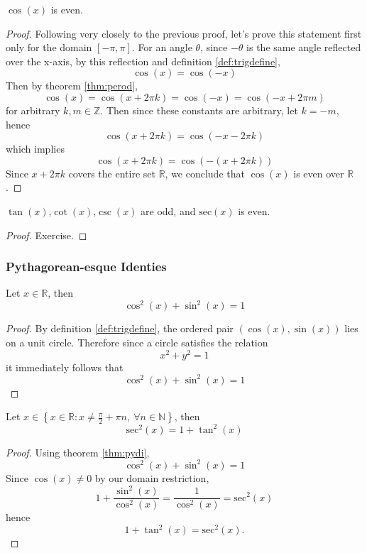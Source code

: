 \documentclass[11pt]{article}
\numberwithin{lemma}{section}
\numberwithin{equation}{section}
\numberwithin{define}{section}
\numberwithin{prop}{section}
\numberwithin{figure}{section}
\numberwithin{theorem}{section}
\numberwithin{cor}{section}
\newcounter{ex}[section]
\numberwithin{ex}{section}
\def\real{\mathbb{R}}
\def\nat{\mathbb{N}}
\def\integ{\mathbb{Z}}
\def\cbrak#1{\left\{#1\right\}}
\begin{document}
\begin{theorem}
	$\cos(x)$ is even.
	\label{thm:coseven}
\end{theorem}
\begin{proof}
	Following very closely to the previous proof, let's prove this statement first only for the domain $[-\pi,\pi]$.
	For an angle $\theta$, since $-\theta$ is the same angle reflected over the x-axis, by this reflection and definition \eqref{def:trigdefine},
	$$\cos(x)=\cos(-x)$$
	Then by theorem \eqref{thm:perod},
	$$\cos(x)=\cos(x+2\pi k)=\cos(-x)=\cos(-x+2\pi m)$$
	for arbitrary $k,m\in\integ$. Then since these constants are arbitrary, let $k=-m$, hence
	$$\cos(x+2\pi k)=\cos(-x-2\pi k)$$
	which implies
	$$\cos(x+2\pi k)=\cos(-(x+2\pi k))$$
	Since $x+2\pi k$ covers the entire set $\real$, we conclude that $\cos(x)$ is even over $\real$.
\end{proof}

\begin{cor}
	$\tan(x)$,$\cot(x)$,$\csc(x)$ are odd, and $\text{sec}(x)$ is even.
\end{cor}
\begin{proof}
	Exercise.
\end{proof}



\subsubsection{Pythagorean-esque Identies}
\begin{theorem}
\label{thm:pydi}
Let $x\in\real$, then
$$\cos^2(x)+\sin^2(x)=1$$
\end{theorem}
\begin{proof}
	By definition \eqref{def:trigdefine}, the ordered pair $(\cos(x),\sin(x))$ lies on a unit circle. Therefore since a circle satisfies the relation
	$$x^2+y^2=1$$
	it immediately follows that
	$$\cos^2(x)+\sin^2(x)=1$$
\end{proof}
\begin{cor}
Let $x\in \cbrak{x\in\real: x\neq \frac{\pi}{2}+\pi n, \:
\forall n\in\nat}$, then
$$\text{sec}^2(x)=1+\tan^2(x)$$
\end{cor}
\begin{proof}
	Using theorem \eqref{thm:pydi},
	$$\cos^2(x)+\sin^2(x)=1$$
	Since $\cos(x)\neq0$ by our domain restriction,
	$$1+\frac{\sin^2(x)}{\cos^2(x)}=\frac{1}{\cos^2(x)}=\text{sec}^2(x)$$
	hence
	$$1+\tan^2(x)=\text{sec}^2(x).$$
\end{proof}
\end{document}

